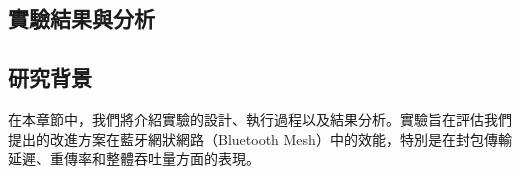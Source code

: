 \begin{ZhChapter}

\chapter{實驗結果與分析}

\section{研究背景}

在本章節中，我們將介紹實驗的設計、執行過程以及結果分析。實驗旨在評估我們提出的改進方案在藍牙網狀網路（Bluetooth Mesh）中的效能，特別是在封包傳輸延遲、重傳率和整體吞吐量方面的表現。



\end{ZhChapter}